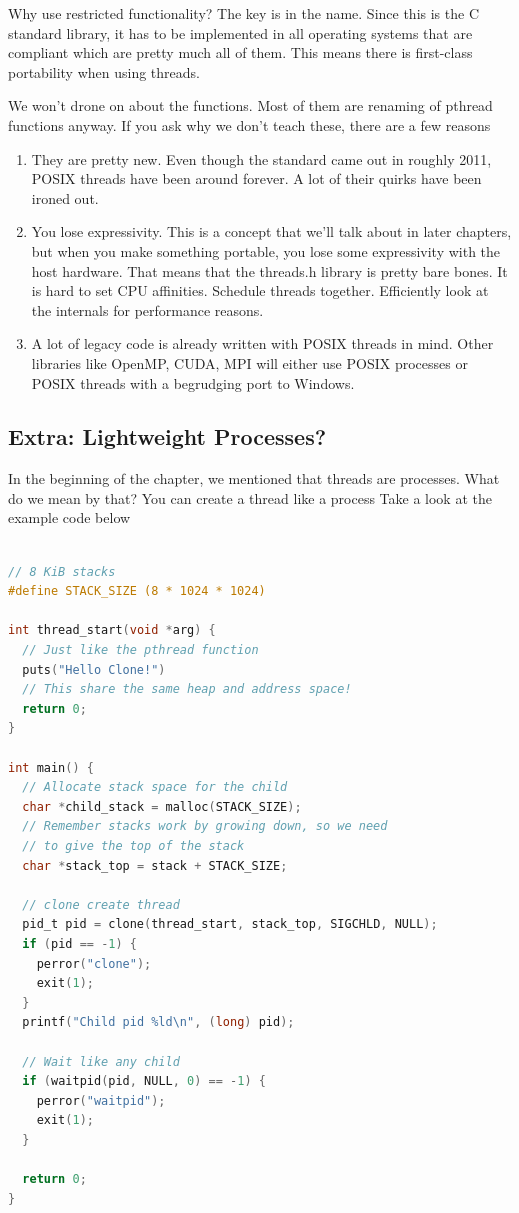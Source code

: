 Why use restricted functionality?
The key is in the name.
Since this is the C standard library, it has to be implemented in all operating systems that are compliant which are pretty much all of them.
This means there is first-class portability when using threads.

We won't drone on about the functions.
Most of them are renaming of pthread functions anyway.
If you ask why we don't teach these, there are a few reasons

\begin{enumerate}
\item They are pretty new. Even though the standard came out in roughly 2011, POSIX threads have been around forever.
  A lot of their quirks have been ironed out.
\item You lose expressivity.
  This is a concept that we'll talk about in later chapters, but when you make something portable, you lose some expressivity with the host hardware.
  That means that the threads.h library is pretty bare bones.
  It is hard to set CPU affinities.
  Schedule threads together.
  Efficiently look at the internals for performance reasons.
\item A lot of legacy code is already written with POSIX threads in mind.
  Other libraries like OpenMP, CUDA, MPI will either use POSIX processes or POSIX threads with a begrudging port to Windows.
\end{enumerate}

\subsection{Extra: Lightweight Processes?}

In the beginning of the chapter, we mentioned that threads are processes.
What do we mean by that?
You can create a thread like a process
Take a look at the example code below

\begin{lstlisting}[language=C]

// 8 KiB stacks
#define STACK_SIZE (8 * 1024 * 1024)

int thread_start(void *arg) {
  // Just like the pthread function
  puts("Hello Clone!")
  // This share the same heap and address space!
  return 0;
}

int main() {
  // Allocate stack space for the child
  char *child_stack = malloc(STACK_SIZE);
  // Remember stacks work by growing down, so we need
  // to give the top of the stack
  char *stack_top = stack + STACK_SIZE;

  // clone create thread
  pid_t pid = clone(thread_start, stack_top, SIGCHLD, NULL);
  if (pid == -1) {
    perror("clone");
    exit(1);
  }
  printf("Child pid %ld\n", (long) pid);

  // Wait like any child
  if (waitpid(pid, NULL, 0) == -1) {
    perror("waitpid");
    exit(1);
  }

  return 0;
}
\end{lstlisting}

